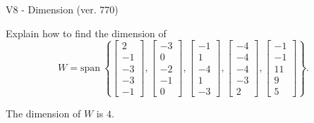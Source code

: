 \begin{exercise}
  \begin{exerciseTitle}V8 - Dimension (ver. 770)\end{exerciseTitle}
  \begin{exerciseStatement}
    Explain how to find the dimension of 
\[W=\mathrm{span}\ \left\{\left[\begin{array}{r}
2 \\
-1 \\
-3 \\
-3 \\
-1
\end{array}\right] , \left[\begin{array}{r}
-3 \\
0 \\
-2 \\
-1 \\
0
\end{array}\right] , \left[\begin{array}{r}
-1 \\
1 \\
-4 \\
1 \\
-3
\end{array}\right] , \left[\begin{array}{r}
-4 \\
-4 \\
-4 \\
-3 \\
2
\end{array}\right] , \left[\begin{array}{r}
-1 \\
-1 \\
11 \\
9 \\
5
\end{array}\right]\right\}.\]



  \end{exerciseStatement}
  \begin{exerciseAnswer}
   The dimension of \(W\) is  \(4\).
  


  \end{exerciseAnswer}
\end{exercise}